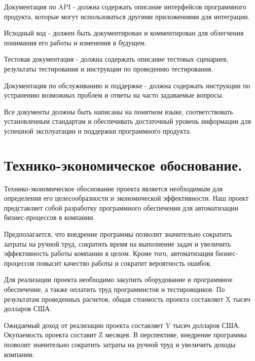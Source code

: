     Документация по API - должна содержать описание интерфейсов программного продукта, которые могут использоваться другими приложениями для интеграции.

    Исходный код - должен быть документирован и комментирован для облегчения понимания его работы и изменения в будущем.

    Тестовая документация - должна содержать описание тестовых сценариев, результаты тестирования и инструкции по проведению тестирования.

    Документация по обслуживанию и поддержке - должна содержать инструкции по устранению возможных проблем и ответы на часто задаваемые вопросы.

Все документы должны быть написаны на понятном языке, соответствовать установленным стандартам и обеспечивать достаточный уровень информации для успешной эксплуатации и поддержки программного продукта.









\newpage
\section{Технико-экономическое обоснование.}






Технико-экономическое обоснование проекта является необходимым для определения его целесообразности и экономической эффективности. Наш проект представляет собой разработку программного обеспечения для автоматизации бизнес-процессов в компании.

Предполагается, что внедрение программы позволит значительно сократить затраты на ручной труд, сократить время на выполнение задач и увеличить эффективность работы компании в целом. Кроме того, автоматизация бизнес-процессов повысит качество работы и сократит вероятность ошибок.

Для реализации проекта необходимо закупить оборудование и программное обеспечение, а также оплатить труд программистов и тестировщиков. По результатам проведенных расчетов, общая стоимость проекта составляет X тысяч долларов США.

Ожидаемый доход от реализации проекта составляет Y тысяч долларов США. Окупаемость проекта составит Z месяцев. В перспективе, внедрение программы позволит значительно сократить затраты на ручной труд и увеличить доходы компании.

